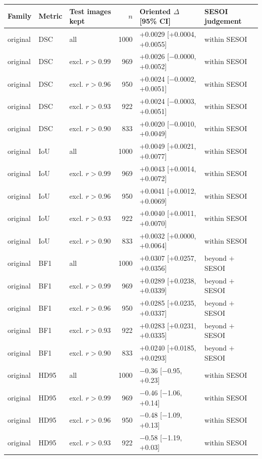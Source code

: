 \begin{tabular}{lllrll}
\toprule
Family & Metric & Test images kept & $n$ & Oriented $\Delta$ [95\% CI] & SESOI judgement \\
\midrule
original & DSC & all & 1000 & +0.0029 [+0.0004, +0.0055] & within SESOI \\
original & DSC & excl. $r>0.99$ & 969 & +0.0026 [$-$0.0000, +0.0052] & within SESOI \\
original & DSC & excl. $r>0.96$ & 950 & +0.0024 [$-$0.0002, +0.0051] & within SESOI \\
original & DSC & excl. $r>0.93$ & 922 & +0.0024 [$-$0.0003, +0.0051] & within SESOI \\
original & DSC & excl. $r>0.90$ & 833 & +0.0020 [$-$0.0010, +0.0049] & within SESOI \\
original & IoU & all & 1000 & +0.0049 [+0.0021, +0.0077] & within SESOI \\
original & IoU & excl. $r>0.99$ & 969 & +0.0043 [+0.0014, +0.0072] & within SESOI \\
original & IoU & excl. $r>0.96$ & 950 & +0.0041 [+0.0012, +0.0069] & within SESOI \\
original & IoU & excl. $r>0.93$ & 922 & +0.0040 [+0.0011, +0.0070] & within SESOI \\
original & IoU & excl. $r>0.90$ & 833 & +0.0032 [+0.0000, +0.0064] & within SESOI \\
original & BF1 & all & 1000 & +0.0307 [+0.0257, +0.0356] & beyond $+$SESOI \\
original & BF1 & excl. $r>0.99$ & 969 & +0.0289 [+0.0238, +0.0339] & beyond $+$SESOI \\
original & BF1 & excl. $r>0.96$ & 950 & +0.0285 [+0.0235, +0.0337] & beyond $+$SESOI \\
original & BF1 & excl. $r>0.93$ & 922 & +0.0283 [+0.0231, +0.0335] & beyond $+$SESOI \\
original & BF1 & excl. $r>0.90$ & 833 & +0.0240 [+0.0185, +0.0293] & beyond $+$SESOI \\
original & HD95 & all & 1000 & $-$0.36 [$-$0.95, +0.23] & within SESOI \\
original & HD95 & excl. $r>0.99$ & 969 & $-$0.46 [$-$1.06, +0.14] & within SESOI \\
original & HD95 & excl. $r>0.96$ & 950 & $-$0.48 [$-$1.09, +0.13] & within SESOI \\
original & HD95 & excl. $r>0.93$ & 922 & $-$0.58 [$-$1.19, +0.03] & within SESOI \\

\end{tabular}
